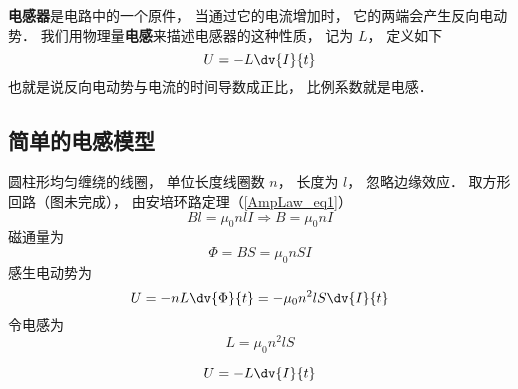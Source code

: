 

\textbf{电感器}是电路中的一个原件， 当通过它的电流增加时， 它的两端会产生反向电动势． 我们用物理量\textbf{电感}来描述电感器的这种性质， 记为 $L$， 定义如下
\begin{equation}
U = -L\dv{I}{t}
\end{equation}
也就是说反向电动势与电流的时间导数成正比， 比例系数就是电感．

\subsection{简单的电感模型}
圆柱形均匀缠绕的线圈， 单位长度线圈数 $n$， 长度为 $l$， 忽略边缘效应． 取方形回路（图未完成）， 由安培环路定理（\autoref{AmpLaw_eq1}）
\begin{equation}
Bl = \mu_0nlI \Rightarrow B = \mu_0nI
\end{equation}
磁通量为
\begin{equation}
\Phi = BS = \mu_0nSI
\end{equation}
感生电动势为
\begin{equation}
U = -nL\dv{\Phi}{t} = -\mu_0n^2lS \dv{I}{t}
\end{equation}
令电感为
\begin{equation}
L = \mu_0n^2lS
\end{equation}

\begin{equation}
U = -L\dv{I}{t}
\end{equation}
